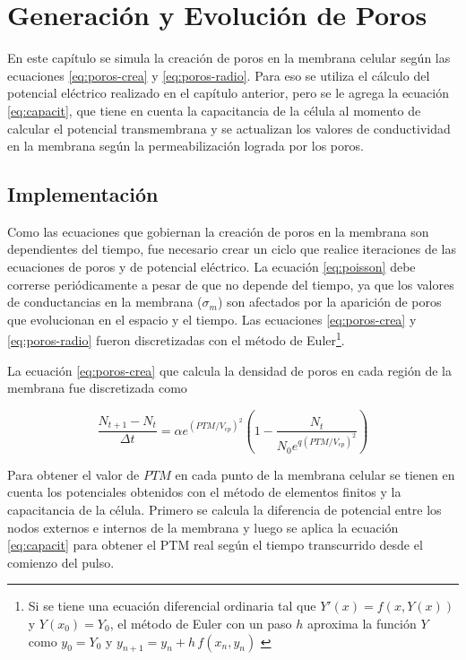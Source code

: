 \chapter{Generación y Evolución de Poros} \label{chap:poros}

En este capítulo se simula la creación de poros en la membrana celular según las ecuaciones \ref{eq:poros-crea} y \ref{eq:poros-radio}. Para eso se utiliza el cálculo del potencial eléctrico realizado en el capítulo anterior, pero se le agrega la ecuación \ref{eq:capacit}, que tiene en cuenta la capacitancia de la célula al momento de calcular el potencial transmembrana y se actualizan los valores de conductividad en la membrana según la permeabilización lograda por los poros.

\section{Implementación}

Como las ecuaciones que gobiernan la creación de poros en la membrana son dependientes del tiempo, fue necesario crear un ciclo que realice iteraciones de las ecuaciones de poros y de potencial eléctrico. La ecuación \ref{eq:poisson} debe correrse periódicamente a pesar de que no depende del tiempo, ya que los valores de conductancias en la membrana ($\sigma_{m}$) son afectados por la aparición de poros que evolucionan en el espacio y el tiempo. Las ecuaciones \ref{eq:poros-crea} y \ref{eq:poros-radio} fueron discretizadas con el método de Euler\footnote{Si se tiene una ecuación diferencial ordinaria tal que $Y'(x) = f(x, Y(x))$ y $Y(x_0) = Y_0$, el método de Euler con un paso $h$ aproxima la función $Y$ como $y_0 = Y_0$ y $y_{n+1} = y_n + h\,f(x_n, y_n)$ \cite{kendall}}.

La ecuación \ref{eq:poros-crea} que calcula la densidad de poros en cada región de la membrana fue discretizada como


\begin{equation} \label{eq:poros-crea-disc}
	\frac{N_{t+1} - N_{t}}{\Delta t} = \alpha e^{(PTM/V_{ep})^2} \left( 1 - \frac{N_{t}}{N_0 e^{q \left(PTM / V_{ep} \right) ^2}} \right)
\end{equation}

Para obtener el valor de $PTM$ en cada punto de la membrana celular se tienen en cuenta los potenciales obtenidos con el método de elementos finitos y la capacitancia de la célula. Primero se calcula la diferencia de potencial entre los nodos externos e internos de la membrana y luego se aplica la ecuación \ref{eq:capacit} para obtener el PTM real según el tiempo transcurrido desde el comienzo del pulso.

